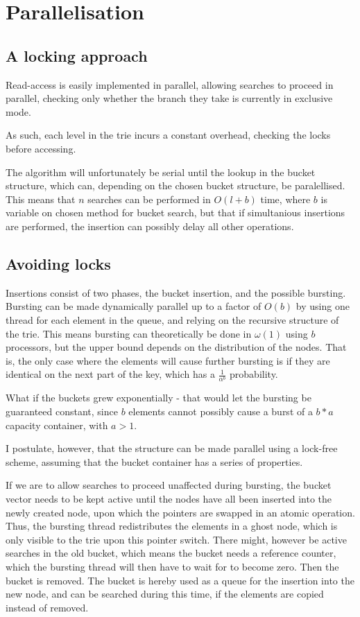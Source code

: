 \documentclass[11pt,a4paper]{article}
\begin{document}
\section{Parallelisation}
\subsection{A locking approach}
Read-access is easily implemented in parallel, allowing searches to proceed in
parallel, checking only whether the branch they take is currently in exclusive
mode.

As such, each level in the trie incurs a constant overhead, checking the locks
before accessing.

The algorithm will unfortunately be serial until the lookup in the bucket
structure, which can, depending on the chosen bucket structure, be
paralellised. This means that $n$ searches can be performed in $O(l+b)$ time,
where $b$ is variable on chosen method for bucket search, but that if
simultanious insertions are performed, the insertion can possibly delay all
other operations.

\subsection{Avoiding locks}
Insertions consist of two phases, the bucket insertion, and the possible
bursting. Bursting can be made dynamically parallel up to a factor of $O(b)$ by
using one thread for each element in the queue, and relying on the recursive
structure of the trie. This means bursting can theoretically be done in
$\omega(1)$ using $b$ processors, but the upper bound depends on the
distribution of the nodes. That is, the only case where the elements will cause
further bursting is if they are identical on the next part of the key, which
has a $\frac{1}{\alpha^b}$ probability.

What if the buckets grew exponentially - that would let the bursting be
guaranteed constant, since $b$ elements cannot possibly cause a burst of a
$b*a$ capacity container, with $a > 1$.


I postulate, however, that the structure can be made parallel using a lock-free
scheme, assuming that the bucket container has a series of properties.

If we are to allow searches to proceed unaffected during bursting, the bucket
vector needs to be kept active until the nodes have all been inserted into the
newly created node, upon which the pointers are swapped in an atomic operation.
Thus, the bursting thread redistributes the elements in a ghost node, which is
only visible to the trie upon this pointer switch. There might, however be
active searches in the old bucket, which means the bucket needs a reference
counter, which the bursting thread will then have to wait for to become zero.
Then the bucket is removed. The bucket is hereby used as a queue for the
insertion into the new node, and can be searched during this time, if the
elements are copied instead of removed.
\end{document}
